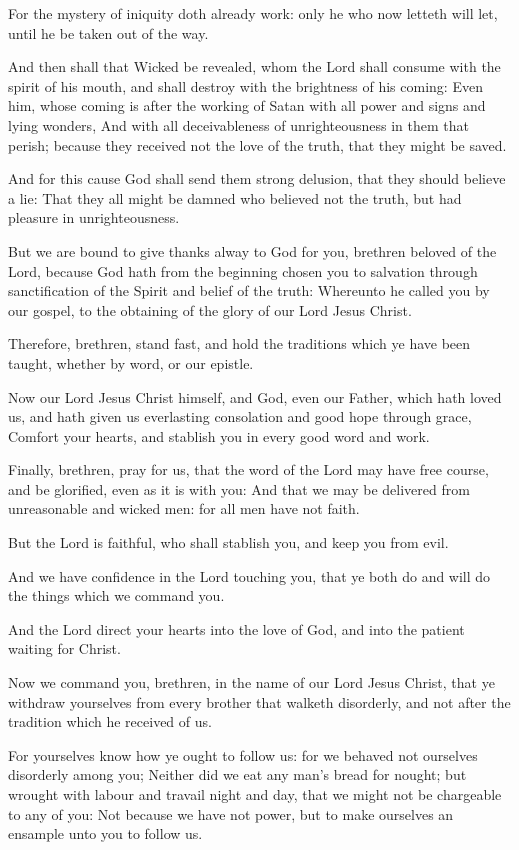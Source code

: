 \Verse For the mystery of iniquity doth already work: only he who now letteth will let, until he be taken out of the way.

\Verse And then shall that Wicked be revealed, whom the Lord shall consume with the spirit of his mouth, and shall destroy with the brightness of his coming: \Verse Even him, whose coming is after the working of Satan with all power and signs and lying wonders, \Verse And with all deceivableness of unrighteousness in them that perish; because they received not the love of the truth, that they might be saved.

\Verse And for this cause God shall send them strong delusion, that they should believe a lie: \Verse That they all might be damned who believed not the truth, but had pleasure in unrighteousness.

\Verse But we are bound to give thanks alway to God for you, brethren beloved of the Lord, because God hath from the beginning chosen you to salvation through sanctification of the Spirit and belief of the truth: \Verse Whereunto he called you by our gospel, to the obtaining of the glory of our Lord Jesus Christ.

\Verse Therefore, brethren, stand fast, and hold the traditions which ye have been taught, whether by word, or our epistle.

\Verse Now our Lord Jesus Christ himself, and God, even our Father, which hath loved us, and hath given us everlasting consolation and good hope through grace, \Verse Comfort your hearts, and stablish you in every good word and work.


\Chapter
\Verse Finally, brethren, pray for us, that the word of the Lord may have free course, and be glorified, even as it is with you: \Verse And that we may be delivered from unreasonable and wicked men: for all men have not faith.

\Verse But the Lord is faithful, who shall stablish you, and keep you from evil.

\Verse And we have confidence in the Lord touching you, that ye both do and will do the things which we command you.

\Verse And the Lord direct your hearts into the love of God, and into the patient waiting for Christ.

\Verse Now we command you, brethren, in the name of our Lord Jesus Christ, that ye withdraw yourselves from every brother that walketh disorderly, and not after the tradition which he received of us.

\Verse For yourselves know how ye ought to follow us: for we behaved not ourselves disorderly among you; \Verse Neither did we eat any man's bread for nought; but wrought with labour and travail night and day, that we might not be chargeable to any of you: \Verse Not because we have not power, but to make ourselves an ensample unto you to follow us.

